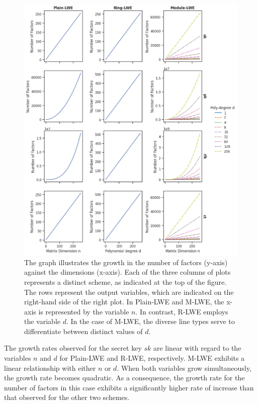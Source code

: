 \begin{figure}[htp]
  \centering
  \includegraphics[scale=0.585]{images/OutputFactors.png}
  \caption[Output Variable Factors by Scheme]{The graph illustrates the growth in the number of factors (y-axis) against the dimensions (x-axis). Each of the three columns of plots represents a distinct scheme, as indicated at the top of the figure. The rows represent the output variables, which are indicated on the right-hand side of the right plot. In Plain-LWE and M-LWE, the x-axis is represented by the variable $n$. In contrast, R-LWE employs the variable $d$. In the case of M-LWE, the diverse line types serve to differentiate between distinct values of $d$.}
  \label{fig:OutputFactors}
\end{figure}

The growth rates observed for the secret key $sk$ are linear with regard to the variables $n$ and $d$ for Plain-LWE and R-LWE, respectively. M-LWE exhibits a linear relationship with either $n$ or $d$. When both variables grow simultaneously, the growth rate becomes quadratic. As a consequence, the growth rate for the number of factors in this case exhibits a significantly higher rate of increase than that observed for the other two schemes.

